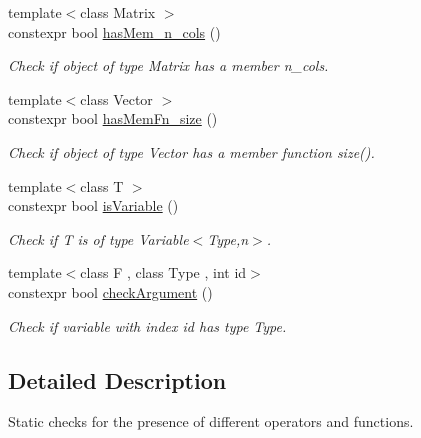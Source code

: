 \begin{DoxyCompactItemize}
{\footnotesize template$<$class Matrix $>$ }\\constexpr bool \hyperlink{group__ConceptCheck_ga0a87aaa714499abcaabd921297be61e4}{has\-Mem\-\_\-n\-\_\-cols} ()
\begin{DoxyCompactList}\small\item\em \-Check if object of type \-Matrix has a member n\-\_\-cols. \end{DoxyCompactList}\item 
{\footnotesize template$<$class Vector $>$ }\\constexpr bool \hyperlink{group__ConceptCheck_ga5e3c3b091f6457e00e7c238cb27def3c}{has\-Mem\-Fn\-\_\-size} ()
\begin{DoxyCompactList}\small\item\em \-Check if object of type \-Vector has a member function size(). \end{DoxyCompactList}\item 
{\footnotesize template$<$class T $>$ }\\constexpr bool \hyperlink{group__ConceptCheck_gac2a1a8aedf54c42cb6d47b3b64bbc761}{is\-Variable} ()
\begin{DoxyCompactList}\small\item\em \-Check if \-T is of type \-Variable$<$\-Type,n$>$. \end{DoxyCompactList}\item 
{\footnotesize template$<$class F , class Type , int id$>$ }\\constexpr bool \hyperlink{group__ConceptCheck_ga31790e5d021a40ac34b7469323c658f9}{check\-Argument} ()
\begin{DoxyCompactList}\small\item\em \-Check if variable with index id has type \-Type. \end{DoxyCompactList}\end{DoxyCompactItemize}


\subsection{\-Detailed \-Description}
\-Static checks for the presence of different operators and functions. 